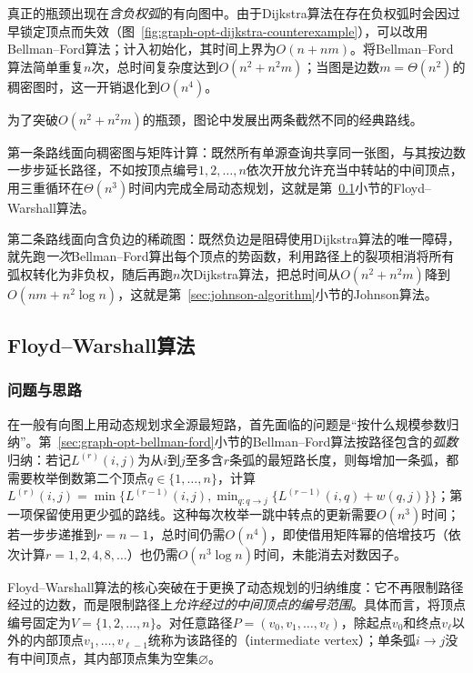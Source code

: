 真正的瓶颈出现在\emph{含负权弧}的有向图中。由于Dijkstra算法在存在负权弧时会因过早锁定顶点而失效（图~\ref{fig:graph-opt-dijkstra-counterexample}），可以改用Bellman--Ford算法；计入初始化，其时间上界为$O(n+nm)$。将Bellman--Ford算法简单重复$n$次，总时间复杂度达到$O(n^2+n^2m)$；当图是边数$m=\Theta(n^2)$的稠密图时，这一开销退化到$O(n^4)$。

为了突破$O(n^2+n^2m)$的瓶颈，图论中发展出两条截然不同的经典路线。

第一条路线面向稠密图与矩阵计算：既然所有单源查询共享同一张图，与其按边数一步步延长路径，不如按顶点编号$1,2,\ldots,n$依次开放允许充当中转站的中间顶点，用三重循环在$\Theta(n^3)$时间内完成全局动态规划，这就是第~\ref{sec:floyd-warshall}小节的Floyd--Warshall算法。

第二条路线面向含负边的稀疏图：既然负边是阻碍使用Dijkstra算法的唯一障碍，就先跑\emph{一次}Bellman--Ford算出每个顶点的势函数，利用路径上的裂项相消将所有弧权转化为非负权，随后再跑$n$次Dijkstra算法，把总时间从$O(n^2+n^2m)$降到$O(nm+n^2\log n)$，这就是第~\ref{sec:johnson-algorithm}小节的Johnson算法。

\subsection{Floyd--Warshall算法}
\label{sec:floyd-warshall}

\subsubsection{问题与思路}

在一般有向图上用动态规划求全源最短路，首先面临的问题是“按什么规模参数归纳”。第~\ref{sec:graph-opt-bellman-ford}小节的Bellman--Ford算法按路径包含的\emph{弧数}归纳：若记$L^{(r)}(i,j)$为从$i$到$j$至多含$r$条弧的最短路长度，则每增加一条弧，都需要枚举倒数第二个顶点$q\in\{1,\ldots,n\}$，计算$L^{(r)}(i,j)=\min\{L^{(r-1)}(i,j),\min_{q:q\to j}\{L^{(r-1)}(i,q)+w(q,j)\}\}$；第一项保留使用更少弧的路线。这种每次枚举一跳中转点的更新需要$O(n^3)$时间；若一步步递推到$r=n-1$，总时间仍需$O(n^4)$，即使借用矩阵幂的倍增技巧（依次计算$r=1,2,4,8,\ldots$）也仍需$O(n^3\log n)$时间，未能消去对数因子。

Floyd--Warshall算法的核心突破在于更换了动态规划的归纳维度：它不再限制路径经过的边数，而是限制路径上\emph{允许经过的中间顶点的编号范围}。具体而言，将顶点编号固定为$V=\{1,2,\ldots,n\}$。对任意路径$P=(v_0,v_1,\ldots,v_\ell)$，除起点$v_0$和终点$v_\ell$以外的内部顶点$v_1,\ldots,v_{\ell-1}$统称为该路径的（intermediate vertex）；单条弧$i\to j$没有中间顶点，其内部顶点集为空集$\varnothing$。

